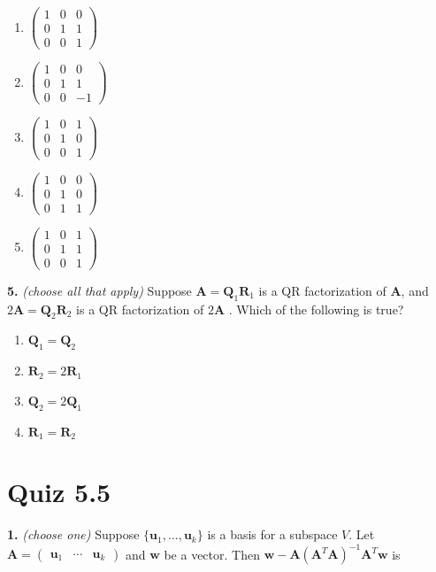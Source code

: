 \documentclass[10pt,a4paper]{article}
\begin{document}
\begin{enumerate}[label=(\Alph*)]
\item \(\begin{pmatrix}1&0&0\\0&1&1\\0&0&1\end{pmatrix}\)
\item \(\begin{pmatrix}1&0&0\\0&1&1\\0&0&-1\end{pmatrix}\)
\item \(\begin{pmatrix}1&0&1\\0&1&0\\0&0&1\end{pmatrix}\)
\item \(\begin{pmatrix}1&0&0\\0&1&0\\0&1&1\end{pmatrix}\)
\item \(\begin{pmatrix}1&0&1\\0&1&1\\0&0&1\end{pmatrix}\)
\end{enumerate}
\smallskip
\textbf{5.} \textit{(choose all that apply)} Suppose \(\mathbf{A=Q}_1\mathbf{R}_1\) is a QR factorization of \(\mathbf{A}\), and  \(2\mathbf{A=Q}_2\mathbf{R}_2\) is a QR factorization of \(2\mathbf{A}\) . Which of the following is true?

\begin{enumerate}[label=(\Alph*)]
\item \(\mathbf{Q}_1=\mathbf{Q}_2\)
\item \(\mathbf{R}_2=2\mathbf{R}_1\)
\item \(\mathbf{Q}_2=2\mathbf{Q}_1\)
\item \(\mathbf{R}_1=\mathbf{R}_2\)
\end{enumerate}
\smallskip
\section{Quiz 5.5}
\textbf{1.} \textit{(choose one)} Suppose \(\{\mathbf u_1,...,\mathbf u_k\}\) is a basis for a subspace \(V\). Let \(\mathbf A=\begin{pmatrix}\mathbf u_1&\cdots&\mathbf u_k\end{pmatrix}\) and \(\mathbf w\) be a vector. Then \(\mathbf w-\mathbf A(\mathbf A^T\mathbf A)^{-1}\mathbf A^T\mathbf w\) is
\end{document}

